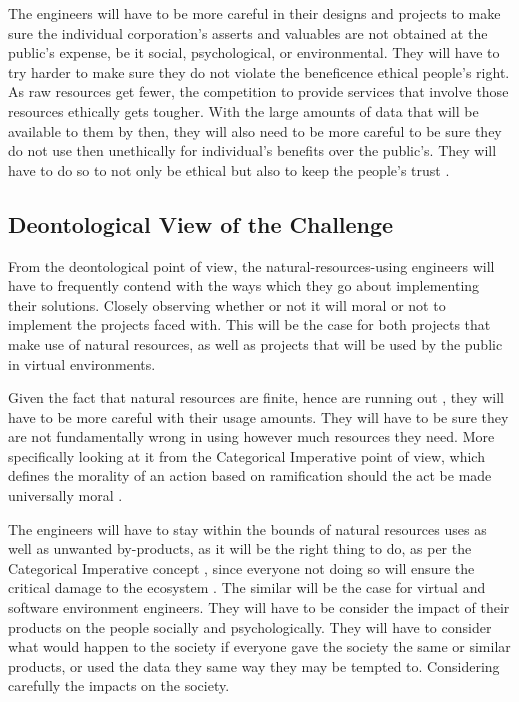 \documentclass[12pt]{witseiepaper}
\begin{document}
The engineers will have to be more careful in their designs and projects to make sure the individual corporation's asserts and valuables are not obtained at the public's expense, be it social, psychological, or environmental. They will have to try harder to make sure they do not violate the beneficence ethical people's right. 
As raw resources get fewer, the competition to provide services that involve those resources ethically gets tougher. With the large amounts of data that will be available to them by then, they will also need to be more careful to be sure they do not use then unethically for individual's benefits over the public's. They will have to do so to not only be ethical but also to keep the people's trust \citep{Masur2020, Smith2011}. 

    \subsection{Deontological View of the Challenge} 

    From the deontological point of view, the natural-resources-using engineers will have to frequently contend with the ways which they go about implementing their solutions. Closely observing whether or not it will moral or not to implement the projects faced with. This will be the case for both projects that make use of natural resources, as well as projects that will be used by the public in virtual environments.
    
    Given the fact that natural resources are finite, hence are running out \citep{subramanian2018crisis}, they will have to be more careful with their usage amounts. They will have to be sure they are not fundamentally wrong in using however much resources they need. More specifically looking at it from the Categorical Imperative point of view, which defines the morality of an action based on ramification should the act be made universally moral \citep{kant1993groundwork}.
    
    The engineers will have to stay within the bounds of natural resources uses as well as unwanted by-products, as it will be the right thing to do, as per the Categorical Imperative concept \citep{basara2018kant}, since everyone not doing so will ensure the critical damage to the ecosystem \citep{appannagari2017environmental}. The similar will be the case for virtual and software environment engineers. They will have to be consider the impact of their products on the people socially and psychologically. They will have to consider what would happen to the society if everyone gave the society the same or similar products, or used the data they same way they may be tempted to. Considering carefully the impacts on the society.  
    
\end{document}

